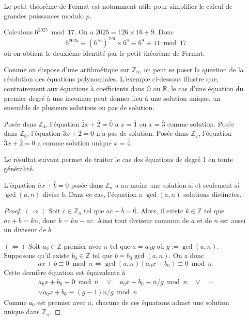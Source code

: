 \documentclass[french,course,oneside,theoremnosection]{lecture}
\newcommand{\R}{\mathbb{R}}
\newcommand{\Z}{\mathbb{Z}}
\newcommand{\Q}{\mathbb{Q}}
\newcommand{\iimplies}{\Rightarrow}
\begin{document}
Le petit théorème de Fermat est notamment utile pour simplifier le calcul de grandes puissances modulo $p$.

\begin{example}
Calculons $6^{2025} \bmod 17$. On a $2025=126\times 16 +9$. Donc 
\[
6^{2025} \equiv (6^{16})^{126} \times 6^9 \equiv 6^9 \equiv 11 \bmod 17
\]
où on obtient le deuxième identité par le petit théorème de Fermat.
\end{example}
 Comme on dispose d'une arithmétique sur $\Z_n$, on peut se poser la question de la résolution des équations polynomiales. L'exemple ci-dessous illustre que, contrairement aux équations à coefficients dans $\Q$ ou $\R$, le cas d'une équation du premier degré à une inconnue peut donner lieu à une solution unique, un ensemble de plusieurs solutions ou pas de solution.
 \begin{example}
Posée dans $\Z_4$, l'équation $\overline{2}x+\overline{2} = \overline{0}$ a $x=\overline{1}$ ou $x=\overline{3}$ comme solution. Posée dans $\Z_6$, l'équation $\overline{3}x+\overline{2}=0$ n'a pas de solution. Posée dans $\Z_{7}$, l'équation $\overline{3}x+\overline{2}=0$ a comme solution unique $x=\overline{4}$.
 \end{example}

Le résultat suivant permet de traiter le cas des équations de degré 1 en toute généralité.
\begin{proposition}
L'équation $\overline{a}x+\overline{b}=0$ posée dans $\Z_n$ a au moins une solution  si et seulement si $\gcd(a,n)$ divise $b$. Dans ce cas, l'équation a $\gcd(a,n)$ solutions distinctes.
\end{proposition}
\begin{proof}
$(\iimplies)$ Soit $\overline{c} \in \Z_n$ tel que $\overline{a}\overline{c}+\overline{b}=\overline{0}$. Alors, il existe $k\in \Z$ tel que $ac+b=kn$, donc $b=kn-ac$. Ainsi tout diviseur commun de $a$ et de $n$ est aussi un diviseur de $b$.

$(\Leftarrow)$ Soit  $a_0 \in \Z$ premier avec $n$ tel que $a=a_0g$ où $g:=\gcd(a,n)$. Supposons qu'il existe $b_0\in \Z$ tel que $b=b_0\gcd(a,n)$. On a donc
\[
ax+b \equiv 0 \bmod n  \iff  \gcd(a,n) (a_0x+b_0)  \equiv 0 \bmod n.
\]
Cette dernière équation est équivalente à
\begin{multline*}
a_0x+b_0 \equiv 0 \bmod n \quad \vee \quad a_0x+b_0 \equiv  n/g \bmod n \quad \vee \quad \cdots \\ \vee a_0x+b_0 \equiv (g-1)n/g \bmod n
\end{multline*}
Comme $a_0$ est premier avec $n$, chacune de ces équations admet une solution unique dans $\Z_n$.
\end{proof}
\end{document}

